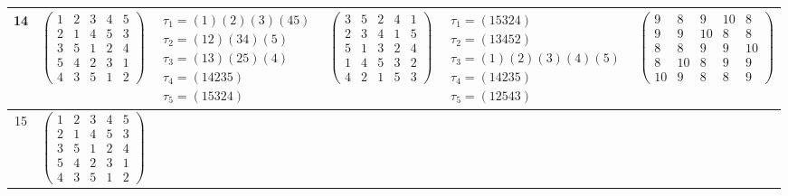 \begin{longtable}{|c|p{2.7cm}|p{2.7cm}|p{2.7cm}|p{2.7cm}|p{3.3cm}|}
    \hline
    14                                                                                                                                          &
    $\begin{pmatrix}1&2&3&4&5\\2&1&4&5&3\\3&5&1&2&4\\5&4&2&3&1\\4&3&5&1&2\end{pmatrix}$                                                         &
    $\begin{array}{l}\tau_{1}=(1)(2)(3)(45)\\ \tau_{2}=(12)(34)(5)\\ \tau_{3}=(13)(25)(4)\\ \tau_{4}=(14235)\\ \tau_{5}=(15324)\end{array}$     &
    $\begin{pmatrix}3&5&2&4&1\\2&3&4&1&5\\5&1&3&2&4\\1&4&5&3&2\\4&2&1&5&3\end{pmatrix}$                                                         &
    $\begin{array}{l}\tau_{1}=(15324)\\ \tau_{2}=(13452)\\ \tau_{3}=(1)(2)(3)(4)(5)\\ \tau_{4}=(14235)\\ \tau_{5}=(12543)\end{array}$           &
    $\begin{pmatrix}9&8&9&10&8\\9&9&10&8&8\\8&8&9&9&10\\8&10&8&9&9\\10&9&8&8&9\end{pmatrix}$                                                                                                                                \\
    \hline
    15                                                                                                                                          &
    $\begin{pmatrix}1&2&3&4&5\\2&1&4&5&3\\3&5&1&2&4\\5&4&2&3&1\\4&3&5&1&2\end{pmatrix}$                                                         &

\end{longtable}

